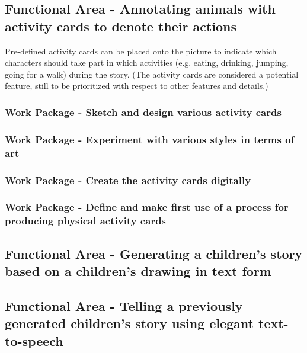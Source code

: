 \subsection{Functional Area - Annotating animals with activity cards to denote their actions}
Pre-defined activity cards can be placed onto the picture to indicate which characters should take part in which activities (e.g. eating, drinking, jumping, going for a walk) during the story. (The activity cards are considered a potential feature, still to be prioritized with respect to other features and details.)

\subsubsection{Work Package - Sketch and design various activity cards}
\subsubsection{Work Package - Experiment with various styles in terms of art}
\subsubsection{Work Package - Create the activity cards digitally}
\subsubsection{Work Package - Define and make first use of a process for producing physical activity cards}

\subsection{Functional Area - Generating a children's story based on a children's drawing in text form}

\subsection{Functional Area - Telling a previously generated children's story using elegant text-to-speech}

